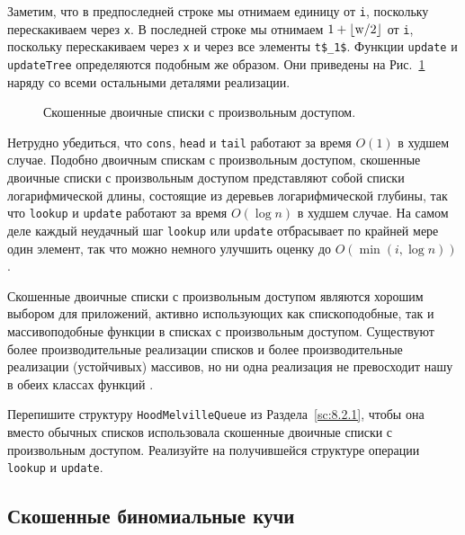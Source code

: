 Заметим, что в предпоследней строке мы отнимаем единицу от \lstinline!i!,
поскольку перескакиваем через \lstinline!x!. В последней строке мы
отнимаем $1 + \lfloor \lstinline!w!/2 \rfloor$ от \lstinline!i!,
поскольку перескакиваем через \lstinline!x! и через все элементы
\lstinline!t$_1$!. Функции \lstinline!update! и \lstinline!updateTree!
определяются подобным же образом. Они приведены на Рис.~\ref{fig:9.7}
наряду со всеми остальными деталями реализации.

\begin{figure}
  \centering
  
  \caption{Скошенные двоичные списки с произвольным доступом.}
  \label{fig:9.7}
\end{figure}

Нетрудно убедиться, что \lstinline!cons!, \lstinline!head! и
\lstinline!tail! работают за время $O(1)$ в худшем случае. Подобно
двоичным спискам с произвольным доступом, скошенные двоичные списки с
произвольным доступом представляют собой списки логарифмической длины,
состоящие из деревьев логарифмической глубины, так что
\lstinline!lookup! и \lstinline!update! работают за время $O(\log n)$
в худшем случае. На самом деле каждый неудачный шаг \lstinline!lookup!
или \lstinline!update! отбрасывает по крайней мере один элемент, так
что можно немного улучшить оценку до $O(\min(i, \log n))$.

\begin{hint}
  Скошенные двоичные списки с произвольным доступом являются хорошим
  выбором для приложений, активно использующих как спископодобные, так
  и массивоподобные функции в списках с произвольным
  доступом. Существуют более производительные реализации списков и
  более производительные реализации (устойчивых) массивов, но ни одна
  реализация не превосходит нашу в обеих классах функций \cite{Okasaki1995b}.
\end{hint}

\begin{exercise}\label{ex:9.14}
  Перепишите структуру \lstinline!HoodMelvilleQueue! из
  Раздела~\ref{sc:8.2.1}, чтобы она вместо обычных списков
  использовала скошенные двоичные списки с произвольным
  доступом. Реализуйте на получившейся структуре операции
  \lstinline!lookup! и \lstinline!update!.
\end{exercise}

\subsection{Скошенные биномиальные кучи}
\label{sc:9.3.2}

